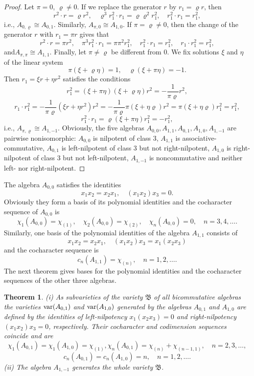 \documentclass{amsart}[12pt]
\newtheorem{theorem}{Theorem}[section]
\theoremstyle{definition}
\begin{document}
\begin{proof}
Let $\pi=0$, $\varrho\not=0$. If we replace the generator $r$ by $r_1=\varrho r$, then
\[
r^2\cdot r=\varrho r^2,\quad \varrho^3r_1^2\cdot r_1=\varrho \varrho^2r_1^2,\quad r_1^2\cdot r_1=r_1^2,
\]
i.e., $A_{0,\varrho}\cong A_{0,1}$. Similarly, $A_{\pi,0}\cong A_{1,0}$. If $\pi=\varrho\not=0$, then the change of the generator $r$ with
$r_1=\pi r$ gives that
\[
r^2\cdot r=\pi r^2,\quad \pi^3r_1^2\cdot r_1=\pi \pi^2r_1^2,\quad r_1^2\cdot r_1=r_1^2,\quad r_1\cdot r_1^2=r_1^2,
\]
and$A_{\pi,\pi}\cong A_{1,1}$. Finally, let $\pi\not=\varrho$ be different from 0. We fix solutions $\xi$ and $\eta$ of the linear system
\[
\pi(\xi+\varrho\eta)=1,\quad \varrho(\xi+\pi\eta)=-1.
\]
Then $r_1=\xi r+\eta r^2$ satisfies the conditions
\[
r_1^2=(\xi+\pi\eta)(\xi+\varrho\eta)r^2=-\frac{1}{\pi\varrho}r^2,
\]
\[
r_1\cdot r_1^2=-\frac{1}{\pi\varrho}(\xi r+\eta r^2)r^2=-\frac{1}{\pi\varrho}\pi(\xi+\eta\varrho)r^2=\pi(\xi+\eta\varrho)r_1^2=r_1^2,
\]
\[
r_1^2\cdot r_1=\varrho(\xi+\pi\eta)r_1^2=-r_1^2,
\]
i.e., $A_{\pi,\varrho}\cong A_{1,-1}$.
Obviously, the five algebras $A_{0,0},A_{1,1},A_{0,1},A_{1,0},A_{1,-1}$ are pairwise nonisomorphic:
$A_{0,0}$ is nilpotent of class 3, $A_{1,1}$ is associative-commutative, $A_{0,1}$ is left-nilpotent of class 3 but not right-nilpotent,
$A_{1,0}$ is right-nilpotent of class 3 but not left-nilpotent, $A_{1,-1}$ is noncommutative and neither left- nor right-nilpotent.
\end{proof}

The algebra $A_{0,0}$ satisfies the identities
\[
x_1x_2=x_2x_1,\quad (x_1x_2)x_3=0.
\]
Obviously they form a basis of its polynomial identities and the cocharacter sequence of $A_{0,0}$ is
\[
\chi_1(A_{0,0})=\chi_{(1)},\quad\chi_2(A_{0,0})=\chi_{(2)},\quad \chi_n(A_{0,0})=0,\quad n=3,4,\ldots.
\]
Similarly, one basis of the polynomial identities of the algebra $A_{1,1}$ consists of
\[
x_1x_2=x_2x_1,\quad (x_1x_2)x_3=x_1(x_2x_3)
\]
and the cocharacter sequence is
\[
c_n(A_{1,1})=\chi_{(n)},\quad n=1,2,\ldots .
\]
The next theorem gives bases for the polynomial identities and the cocharacter sequences of the other three algebras.

\begin{theorem}\label{PIs of two-dimensional algebras}
{\rm (i)} As subvarieties of the variety $\mathfrak B$ of all bicommutative algebras the varieties $\text{\rm var}(A_{0,1})$ and $\text{\rm var}(A_{1,0})$ generated
by the algebras $A_{0,1}$ and $A_{1,0}$ are defined by the identities of left-nilpotency $x_1(x_2x_3)=0$ and right-nilpotency $(x_1x_2)x_3=0$, respectively.
Their cocharacter and codimension sequences coincide and are
\[
\chi_1(A_{0,1})=\chi_1(A_{1,0})=\chi_{(1)},\chi_n(A_{0,1})=\chi_{(n)}+\chi_{(n-1,1)},\quad n=2,3,\ldots,
\]
\[
c_n(A_{0,1})=c_n(A_{1,0})=n,\quad n=1,2,\ldots.
\]
 {\rm (ii)} The algebra $A_{1,-1}$ generates the whole variety $\mathfrak B$.
\end{theorem}
\end{document}

